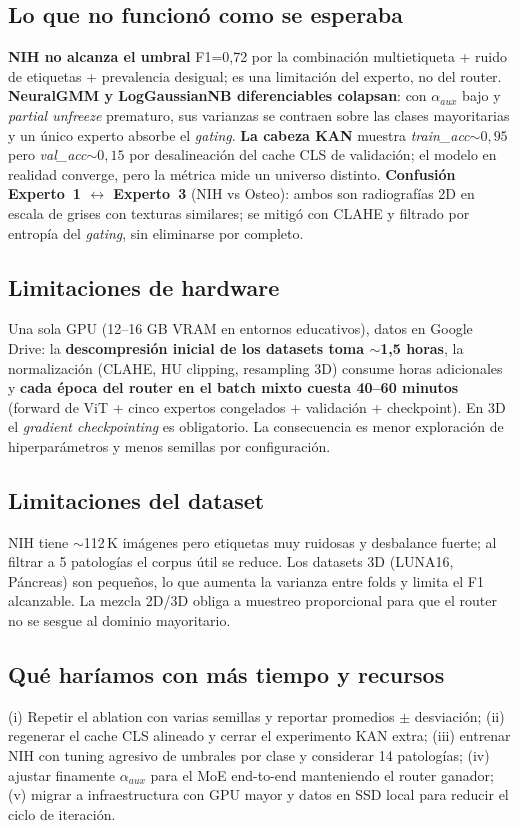 \documentclass[conference]{IEEEtran}
\begin{document}
\subsection*{Lo que no funcionó como se esperaba}
\textbf{NIH no alcanza el umbral} F1=0,72 por la combinación multietiqueta + ruido de etiquetas + prevalencia desigual; es una limitación del experto, no del router. \textbf{NeuralGMM y LogGaussianNB diferenciables colapsan}: con $\alpha_{aux}$ bajo y \textit{partial unfreeze} prematuro, sus varianzas se contraen sobre las clases mayoritarias y un único experto absorbe el \textit{gating}. \textbf{La cabeza KAN} muestra \textit{train\_acc}$\sim 0{,}95$ pero \textit{val\_acc}$\sim 0{,}15$ por desalineación del cache CLS de validación; el modelo en realidad converge, pero la métrica mide un universo distinto. \textbf{Confusión Experto~1 $\leftrightarrow$ Experto~3} (NIH vs Osteo): ambos son radiografías 2D en escala de grises con texturas similares; se mitigó con CLAHE y filtrado por entropía del \textit{gating}, sin eliminarse por completo.

\subsection*{Limitaciones de hardware}
Una sola GPU (12--16 GB VRAM en entornos educativos), datos en Google Drive: la \textbf{descompresión inicial de los datasets toma $\sim$1,5 horas}, la normalización (CLAHE, HU clipping, resampling 3D) consume horas adicionales y \textbf{cada época del router en el batch mixto cuesta 40--60 minutos} (forward de ViT + cinco expertos congelados + validación + checkpoint). En 3D el \textit{gradient checkpointing} es obligatorio. La consecuencia es menor exploración de hiperparámetros y menos semillas por configuración.

\subsection*{Limitaciones del dataset}
NIH tiene $\sim$112\,K imágenes pero etiquetas muy ruidosas y desbalance fuerte; al filtrar a 5 patologías el corpus útil se reduce. Los datasets 3D (LUNA16, Páncreas) son pequeños, lo que aumenta la varianza entre folds y limita el F1 alcanzable. La mezcla 2D/3D obliga a muestreo proporcional para que el router no se sesgue al dominio mayoritario.

\subsection*{Qué haríamos con más tiempo y recursos}
(i) Repetir el ablation con varias semillas y reportar promedios $\pm$ desviación; (ii) regenerar el cache CLS alineado y cerrar el experimento KAN extra; (iii) entrenar NIH con tuning agresivo de umbrales por clase y considerar 14 patologías; (iv) ajustar finamente $\alpha_{aux}$ para el MoE end-to-end manteniendo el router ganador; (v) migrar a infraestructura con GPU mayor y datos en SSD local para reducir el ciclo de iteración.
\end{document}
